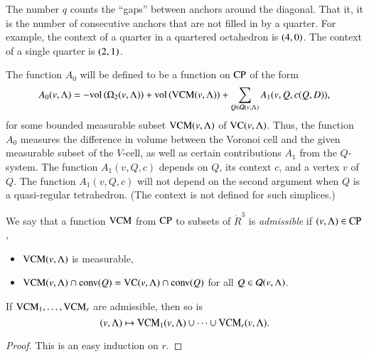 \begin{remark}
The number $q$ counts the ``gaps'' between anchors around the
diagonal. That it, it is the number of consecutive anchors that
are not filled in by a quarter.  For example, the context of a
quarter in a quartered octahedron is $\relax(4,0)$. The context of a
single quarter is $\relax(2,1)$.
\end{remark}

The function $A_0$ will be defined to be a function on ${\operatorname{CP}}$
of the form
  \begin{equation}
  A_0(v,\Lambda) = -{\operatorname{vol}}\,(\Omega_2(v,\Lambda)) + {\operatorname{vol}}\,({\operatorname{VCM}}(v,\Lambda)) +
   \sum_{Q\in{\mathcal Q}(v,\Lambda)} A_1(v,Q,c(Q,D)),
   \label{eqn:A1}
   \end{equation}
for some bounded measurable subset ${\operatorname{VCM}}(v,\Lambda)$ of ${\operatorname{VC}}(v,\Lambda)$.
Thus, the function $A_0$ measures the difference in volume between
the Voronoi cell and the given measurable subset of the $V$-cell,
as well as certain contributions $A_1$ from the $Q$-system. The
function $A_1(v,Q,c)$ depends on $Q$, its context $c$, and a
vertex $v$ of $Q$.  The function $A_1(v,Q,c)$ will not depend on
the second argument when $Q$ is a quasi-regular tetrahedron.  (The
context is not defined for such simplices.)

\begin{definition}\label{def:vcm-admiss}  We say that a function ${\operatorname{VCM}}$ from
${\operatorname{CP}}$ to subsets of $\ring{R}^3$ is {\it admissible} if
$(v,\Lambda)\in{\operatorname{CP}}$,
    \begin{itemize}
        \item ${\operatorname{VCM}}(v,\Lambda)$ is measurable,
        \item ${\operatorname{VCM}}(v,\Lambda)\cap {\operatorname{conv}}(Q) = 
         {\operatorname{VC}}(v,\Lambda)\cap {\operatorname{conv}}(Q)$ for all
        $Q\in{\mathcal Q}(v,\Lambda)$.
    \end{itemize}
\end{definition}

\begin{lemma} If ${\operatorname{VCM}}_1,\ldots,{\operatorname{VCM}}_r$ are admissible,
then so is $$(v,\Lambda)\mapsto {\operatorname{VCM}}_1(v,\Lambda)\cup\cdots\cup {\operatorname{VCM}}_r(v,\Lambda).$$
\end{lemma}

\begin{proof} This is an easy induction on $r$.
\end{proof}

